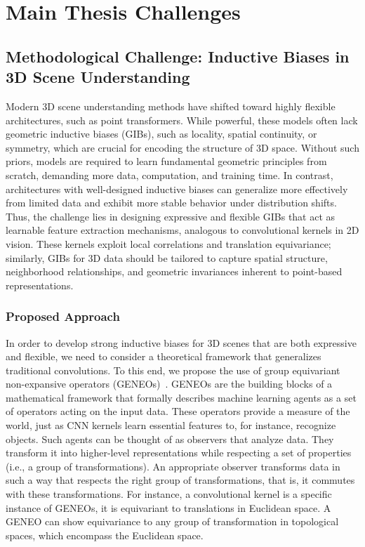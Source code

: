 \section{Main Thesis Challenges}

\subsection{Methodological Challenge: Inductive Biases in 3D Scene Understanding}
%
Modern 3D scene understanding methods have shifted toward highly flexible
architectures, such as point transformers. While powerful, these models often
lack geometric inductive biases (GIBs), such as locality, spatial continuity,
or symmetry, which are crucial for encoding the structure of 3D space.
%
Without such priors, models are required to learn fundamental geometric
principles from scratch, demanding more data, computation, and training time.
In contrast, architectures with well-designed inductive biases can generalize
more effectively from limited data and exhibit more stable behavior under
distribution shifts.
%
Thus, the challenge lies in designing expressive and flexible GIBs that act as
learnable feature extraction mechanisms, analogous to convolutional kernels in
2D vision.
%
These kernels exploit local correlations and translation equivariance;
similarly, GIBs for 3D data should be tailored to capture spatial structure,
neighborhood relationships, and geometric invariances inherent to point-based
representations.

\subsubsection{Proposed Approach}
%
In order to develop strong inductive biases for 3D scenes that are both
expressive and flexible, we need to consider a theoretical framework that
generalizes traditional convolutions.
%
To this end, we propose the use of group equivariant non-expansive operators
(GENEOs)~\cite{bergomi2019towards,cascarano2021geometric}.
%
GENEOs are the building blocks of a mathematical framework that formally
describes machine learning agents as a set of operators acting on the input
data. These operators provide a measure of the world, just as CNN kernels learn
essential features to, for instance, recognize objects. Such agents can be
thought of as observers that analyze data. They transform it into higher-level
representations while respecting a set of properties (i.e., a group of
transformations). An appropriate observer transforms data in such a way that
respects the right group of transformations, that is, it commutes with these
transformations.
%
For instance, a convolutional kernel is a specific instance of GENEOs, it is
equivariant to translations in Euclidean space. A GENEO can show equivariance
to any group of transformation in topological spaces, which encompass the
Euclidean space.
%

